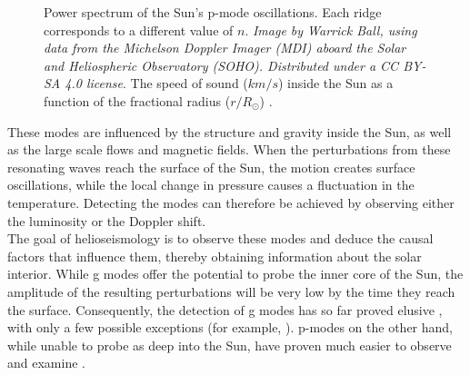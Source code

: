 \documentclass[11pt,a4paper,onecolumn]{report}
\begin{document}
\begin{figure}[t]
  \centering
   \caption{ Power spectrum of the Sun's p-mode
  oscillations. Each ridge corresponds to a different value of \(n\).
  \textit{Image by Warrick Ball, using data from the Michelson Doppler Imager
  (MDI) aboard the Solar and Heliospheric Observatory (SOHO). Distributed under
  a CC BY-SA 4.0 license}.  The speed of sound
  (\(\si{km\per s}\)) inside the Sun as a function of the fractional radius
  (\(\si{r \per R_\odot}\)) \citep{bahcall_solar_2000}.}

\end{figure}

These modes are influenced by the structure and gravity inside the Sun, as well
as the large scale flows and magnetic fields. When the perturbations from these
resonating waves reach the surface of the Sun, the motion creates surface
oscillations, while the local change in pressure causes a fluctuation in the
temperature. Detecting the modes can therefore be achieved by observing either the
luminosity or the Doppler shift.\\

The goal of helioseismology is to observe these modes and deduce the causal
factors that influence them, thereby obtaining information about the solar
interior. While g modes offer the potential to probe the inner core of the Sun,
the amplitude of the resulting perturbations will be very low by the time they
reach the surface. Consequently, the detection of g modes has so far proved
elusive \citep{appourchaux_quest_2010}, with only a few possible exceptions (for
example, \citealp{fossat_asymptotic_2017}). p-modes on the other hand, while
unable to probe as deep into the Sun, have proven much easier to observe and
examine \citep{deubner_observations_1975}. \\
\end{document}
